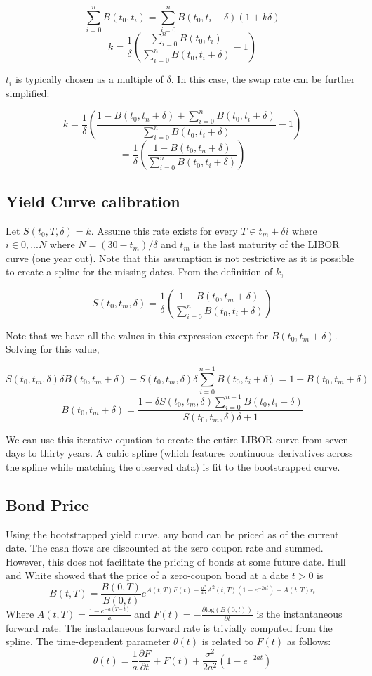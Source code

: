 \documentclass{article}
\theoremstyle{definition}
\begin{document}
\[\sum_{i=0}^n B(t_0, t_i)=\sum_{i=0}^n B(t_0, t_i+\delta)\left(1+k\delta\right)\]
\[k=\frac{1}{\delta}\left(\frac{\sum_{i=0}^n B(t_0, t_i)}{\sum_{i=0}^n B(t_0, t_i+\delta)}-1\right)\]

\(t_i\) is typically chosen as a multiple of \(\delta\).  In this case, the swap rate can be further simplified:

\[k=\frac{1}{\delta}\left(\frac{1-B(t_0, t_n+\delta)+\sum_{i=0}^n B(t_0, t_i+\delta)}{\sum_{i=0}^n B(t_0, t_i+\delta)}-1\right)\]
\[=\frac{1}{\delta}\left(\frac{1-B(t_0, t_n+\delta)}{\sum_{i=0}^n B(t_0, t_i+\delta)}\right)\]

\subsection{Yield Curve calibration}
Let \(S(t_0, T, \delta)=k\).  Assume this rate exists for every \(T \in t_m+\delta i\) where \(i\in 0,...N\) where \(N=(30-t_m)/ \delta\) and \(t_m\) is the last maturity of the LIBOR curve (one year out).  Note that this assumption is not restrictive as it is possible to create a spline for the missing dates.  From the definition of \(k\), 

\[S(t_0, t_m, \delta)=\frac{1}{\delta}\left(\frac{1-B(t_0, t_m+\delta)}{\sum_{i=0}^n B(t_0, t_i+\delta)}\right)\]

Note that we have all the values in this expression except for \(B(t_0, t_m+\delta)\).  Solving for this value,

\[S(t_0, t_m, \delta)\delta B(t_0, t_m+\delta)+ S(t_0, t_m, \delta)\delta\sum_{i=0}^{n-1} B(t_0, t_i+\delta)=1-B(t_0, t_m+\delta)\]
\[B(t_0, t_m+\delta)=\frac{1-\delta S(t_0, t_m, \delta)\sum_{i=0}^{n-1} B(t_0, t_i+\delta)}{S(t_0, t_m, \delta)\delta+1}\]

We can use this iterative equation to create the entire LIBOR curve from seven days to thirty years. A cubic spline (which features continuous derivatives across the spline while matching the observed data) is fit to the bootstrapped curve.
 
\subsection{Bond Price}

Using the bootstrapped yield curve, any bond can be priced as of the current date.  The cash flows are discounted at the zero coupon rate and summed.  However, this does not facilitate the pricing of bonds at some future date.  Hull and White showed that the price of a zero-coupon bond at a date \(t>0\) is 
\[B(t, T)=\frac{B(0, T)}{B(0, t)}e^{A(t, T)F(t)-\frac{\sigma^2}{4a}A^2 (t, T)\left(1-e^{-2at}\right)-A(t, T)r_t}\]
Where \(A(t, T)=\frac{1-e^{-a(T-t)}}{a}\) and \(F(t)=-\frac{\partial \mathrm{log}(B(0, t))}{\partial t}\) is the instantaneous forward rate. The instantaneous forward rate is trivially computed from the spline. The time-dependent parameter \(\theta(t)\) is related to \(F(t)\) as follows:\[\theta(t)=\frac{1}{a} \frac{\partial F}{\partial t}+F(t)+\frac{\sigma^2}{2a^2}\left(1-e^{-2at}\right)\]
\end{document}
